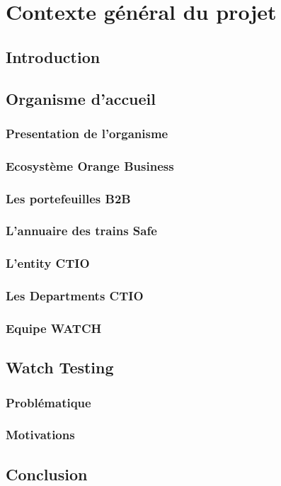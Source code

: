 \chapter{Contexte général du projet}

\section{Introduction}

\section{Organisme d’accueil}
\subsection{Presentation de l’organisme}
\subsection{Ecosystème Orange Business}
\subsection{Les portefeuilles B2B}
\subsection{L'annuaire des trains Safe}
\subsection{L'entity CTIO}
\subsection{Les Departments CTIO}
\subsection{Equipe WATCH}

\section{Watch Testing}
\subsection{Problématique}
\subsection{Motivations}

\section{Conclusion}